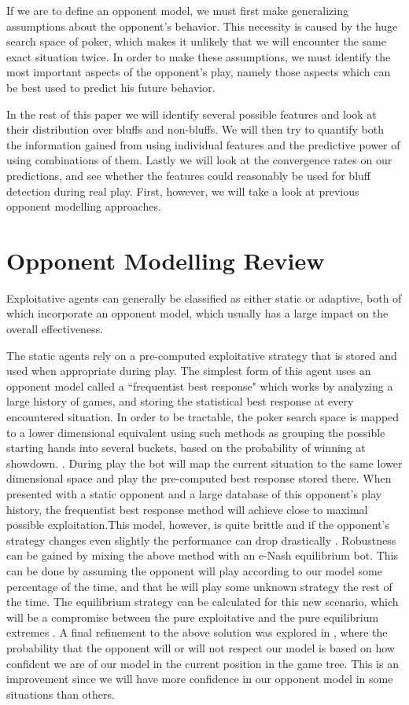 \documentclass[letterpaper]{article}
\begin{document}
If we are to define an opponent model, we must first make generalizing assumptions about the opponent's behavior. This necessity is caused by the huge search space of poker, which makes it unlikely that we will encounter the same exact situation twice. In order to make these assumptions, we must identify the most important aspects of the opponent's play, namely those aspects which can be best used to predict his future behavior.

In the rest of this paper we will identify several possible features and look at their distribution over bluffs and non-bluffs. We will then try to quantify both the information gained from using individual features and the predictive power of using combinations of them. Lastly we will look at the convergence rates on our predictions, and see whether the features could reasonably be used for bluff detection during real play. First, however, we will take a look at previous opponent modelling approaches.


\section{
\fontsize{12pt}{15pt} 
\selectfont
Opponent Modelling Review}
\fontsize{10pt}{12pt} 
\selectfont
Exploitative agents can generally be classified as either static or adaptive, both of which incorporate an opponent model, which usually has a large impact on the overall effectiveness. \cite{P1} 

The static agents rely on a pre-computed exploitative strategy that is stored and used when appropriate during play. The simplest form of this agent uses an opponent model called a ``frequentist best response" which works by analyzing a large history of games, and storing the statistical best response at every encountered situation. In order to be tractable, the poker search space is mapped to a lower dimensional equivalent using such methods as grouping the possible starting hands into several buckets, based on the probability of winning at showdown. \cite{P4,P9}. During play the bot will map the current situation to the same lower dimensional space and play the pre-computed best response stored there. When presented with a static opponent and a large database of this opponent's play history, the frequentist best response method will achieve close to maximal possible exploitation.This model, however, is quite brittle and if the opponent's strategy changes even slightly the performance can drop drastically  \cite{P3}. Robustness can be gained by mixing the above method with an e-Nash equilibrium bot. This can be done by assuming the opponent will play according to our model some percentage of the time, and that he will play some unknown strategy the rest of the time. The equilibrium strategy can be calculated for this new scenario, which will be a compromise between the pure exploitative and the pure equilibrium extremes  \cite{P2,P3}. A final refinement to the above solution was explored in  \cite{P5}, where the probability that the opponent will or will not respect our model is based on how confident we are of our model in the current position in the game tree. This is an improvement since we will have more confidence in our opponent model in some situations than others.
\end{document}
